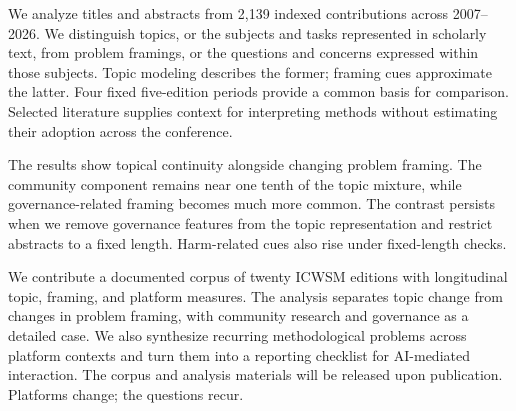 We analyze titles and abstracts from 2,139 indexed contributions across 2007--2026. We distinguish topics, or the subjects and tasks represented in scholarly text, from problem framings, or the questions and concerns expressed within those subjects. Topic modeling describes the former; framing cues approximate the latter. Four fixed five-edition periods provide a common basis for comparison. Selected literature supplies context for interpreting methods without estimating their adoption across the conference.

The results show topical continuity alongside changing problem framing. The community component remains near one tenth of the topic mixture, while governance-related framing becomes much more common. The contrast persists when we remove governance features from the topic representation and restrict abstracts to a fixed length. Harm-related cues also rise under fixed-length checks.

We contribute a documented corpus of twenty ICWSM editions with longitudinal topic, framing, and platform measures. The analysis separates topic change from changes in problem framing, with community research and governance as a detailed case. We also synthesize recurring methodological problems across platform contexts and turn them into a reporting checklist for AI-mediated interaction. The corpus and analysis materials will be released upon publication. Platforms change; the questions recur.
